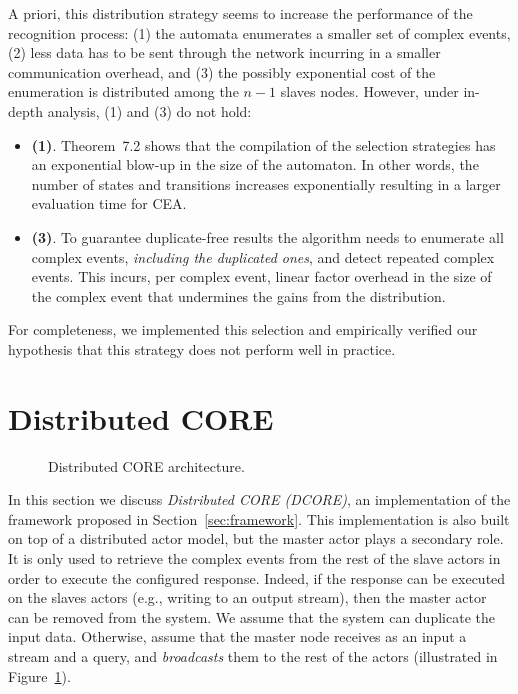A priori, this distribution strategy seems to increase the performance of the recognition process: (1) the automata enumerates a smaller set of complex events, (2) less data has to be sent through the network incurring in a smaller communication overhead, and (3) the possibly exponential cost of the enumeration is distributed among the $n - 1$ slaves nodes. However, under in-depth analysis, (1) and (3) do not hold:

\begin{itemize}
  \item[] \textbf{(1)}. Theorem~7.2 \cite{formal-framework-cer} shows that the compilation of the selection strategies has an exponential blow-up in the size of the automaton. In other words, the number of states and transitions increases exponentially resulting in a larger evaluation time for CEA.

  \item[] \textbf{(3)}. To guarantee duplicate-free results the algorithm needs to enumerate all complex events, \emph{including the duplicated ones}, and detect repeated complex events. This incurs, per complex event, linear factor overhead in the size of the complex event that undermines the gains from the distribution.
\end{itemize}

For completeness, we implemented this selection and empirically verified our hypothesis that this strategy does not perform well in practice.

\section{Distributed CORE}\label{sec:dcore}

\begin{figure}[H]
  \centering
  \caption{Distributed CORE architecture.}
  \label{fig:dcore}
\end{figure}

In this section we discuss \emph{Distributed CORE (DCORE)}, an implementation of the framework proposed in Section~\ref{sec:framework}. This implementation is also built on top of a distributed actor model, but the master actor plays a secondary role. It is only used to retrieve the complex events from the rest of the slave actors in order to execute the configured response. Indeed, if the response can be executed on the slaves actors (e.g., writing to an output stream), then the master actor can be removed from the system. We assume that the system can duplicate the input data. Otherwise, assume that the master node receives as an input a stream and a query, and \emph{broadcasts} them to the rest of the actors (illustrated in Figure~\ref{fig:dcore}).


